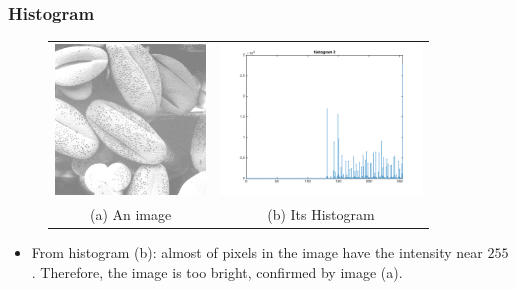 \documentclass[english,11pt,table,handout]{beamer}
\begin{document}
\begin{frame}[fragile]
\frametitle{Histogram}
\begin{figure}[!h]
	\begin{table}
		\begin{tabular}{cc}
			\includegraphics[height=4cm]{./images/bean2.jpg} &
			\includegraphics[height=4cm]{./images/histogram2.png} \\
			(a) An image & (b) Its Histogram
		\end{tabular}
	\end{table}
\end{figure}
\begin{itemize}
	\item From histogram (b): almost of pixels in the image have the intensity near $255$. Therefore, the image is too bright, confirmed by image (a).
\end{itemize}
\end{frame}
\end{document}
